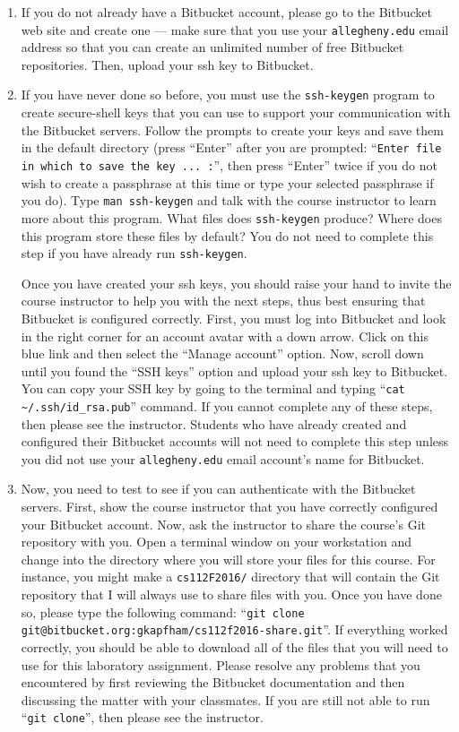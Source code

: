 \begin{enumerate}
  \setlength{\itemsep}{0pt}

\item If you do not already have a Bitbucket account, please go to the Bitbucket web site and create one ---
  make sure that you use your {\tt allegheny.edu} email address so that you can create an unlimited number of free
  Bitbucket repositories. Then, upload your ssh key to Bitbucket.

\item If you have never done so before, you must use the {\tt ssh-keygen} program to create secure-shell keys that you
  can use to support your communication with the Bitbucket servers. Follow the prompts to create your keys and save
  them in the default directory (press ``Enter'' after you are prompted: ``{\tt Enter file in which to save the key ...
  :}'', then press ``Enter'' twice if you do not wish to create a passphrase at this time or type your selected
  passphrase if you do).   Type {\tt man ssh-keygen} and talk with the course instructor to learn more about this
  program.  What files does {\tt ssh-keygen} produce?  Where does this program store these files by default?  You do
  not need to complete this step if you have already run {\tt ssh-keygen}.

  Once you have created your ssh keys, you should raise your hand to invite the course instructor to help you with the
  next steps, thus best ensuring that Bitbucket is configured correctly. First, you must log into Bitbucket and look
  in the right corner for an account avatar with a down arrow.  Click on this blue link and then select the ``Manage
  account'' option. Now, scroll down until you found the ``SSH keys'' option and upload your ssh key to Bitbucket. You
  can copy your SSH key by going to the terminal and typing ``{\tt cat \textasciitilde{}/.ssh/id\_rsa.pub}'' command.
  If you cannot complete any of these steps, then please see the instructor. Students who have already created
  and configured their Bitbucket accounts will not need to complete this step unless you did not use your
  {\tt allegheny.edu} email account's name for Bitbucket.

\item Now, you need to test to see if you can authenticate with the Bitbucket servers.  First, show the course
  instructor that you have correctly configured your Bitbucket account.  Now, ask the instructor to share the course's
  Git repository with you.  Open a terminal window on your workstation and change into the directory where you will
  store your files for this course.  For instance, you might make a {\tt cs112F2016/} directory that will contain the
  Git repository that I will always use to share files with you.  Once you have done so, please type the following
  command: ``{\tt git clone git@bitbucket.org:gkapfham/cs112f2016-share.git}''.  If everything worked correctly, you
  should be able to download all of the files that you will need to use for this laboratory assignment. Please resolve
  any problems that you encountered by first reviewing the Bitbucket documentation and then discussing the matter
  with your classmates. If you are still not able to run ``{\tt git clone}'', then please see the instructor.


\end{enumerate}
